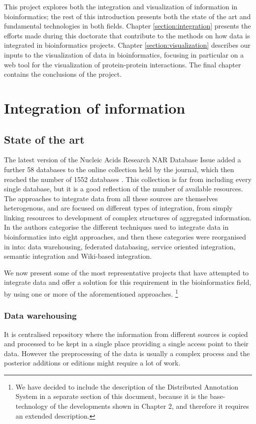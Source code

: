 This project explores both the integration and visualization of information in bioinformatics; the rest of this introduction presents both the state of the art and fundamental technologies in both fields. Chapter \ref{section:integration} presents the efforts made during this doctorate that contribute to the methods on how data is integrated in bioinformatics projects. Chapter \ref{section:visualization} describes our inputs to the visualization of data in bioinformatics, focusing in particular on a web tool for the visualization of protein-protein interactions. The final chapter contains the conclusions of the project.

\section{Integration of information}
\subsection{State of the art}
The latest version of the Nucleic Acids Research NAR Database Issue added a further 58 databases to the online collection held by the journal, which then reached the number of 1552 databases \cite{FER2014}. This collection is far from including every single database, but it is  a good reflection of the number of available resources.
The approaches to integrate data from all these sources are themselves heterogenous, and are focused on different types of integration, from simply linking resources to development of complex structures of aggregated information. In \cite{GOB2008} the authors categorise the different techniques used to integrate data in bioinformatics into eight approaches, and then these categories were reorganised in \cite{ZHA2011b} into: data warehousing, federated databasing, service oriented integration, semantic integration and Wiki-based integration.

We now present some of the most representative projects that have attempted to integrate data and offer a solution for this requirement in the bioinformatics field, by using one or more of the aforementioned approaches. \footnote{We have decided to include the description of the Distributed Annotation System in a separate section of this document, because it is the base-technology of the developments shown in Chapter 2, and therefore it requires an extended description.}

\subsubsection{Data warehousing} 
It is centralised repository where the information from different sources is copied and processed to be kept  in a single place providing a single access point to their data. However the preprocessing of the data is usually a complex process and the posterior additions or editions might require a lot of work.

